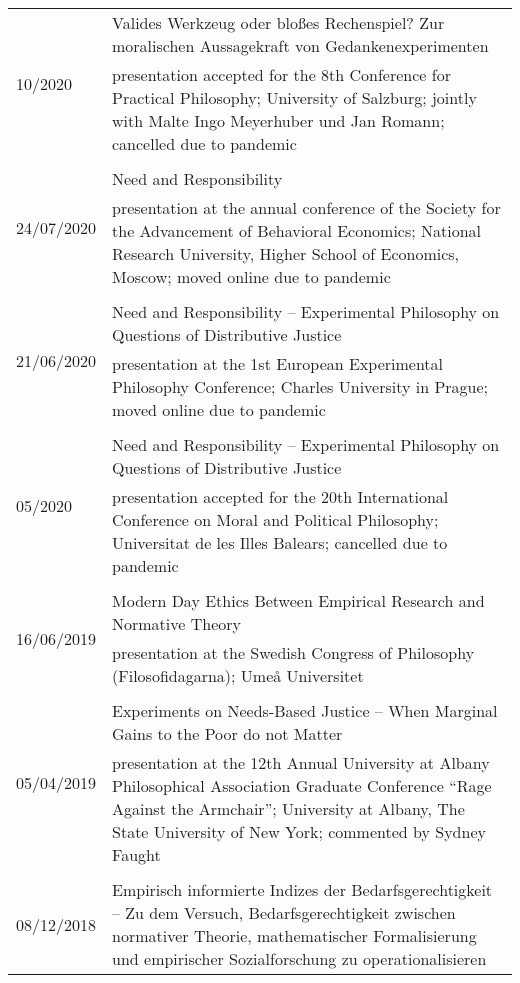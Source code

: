 \documentclass[a4paper,10pt]{article}
\begin{document}
\begin{longtable}{p{}p{11cm}}
\multirow{2}{2,25cm}{\footnotesize{10/2020}} & Valides Werkzeug oder bloßes Rechenspiel? Zur moralischen Aussagekraft von Gedankenexperimenten\\
& \footnotesize{presentation accepted for the 8th Conference for Practical Philosophy; University of Salzburg; jointly with Malte Ingo Meyerhuber und Jan Romann; cancelled due to pandemic}\\
\\
\multirow{2}{2,25cm}{\footnotesize{24/07/2020}} & Need and Responsibility\\
& \footnotesize{presentation at the annual conference of the Society for the Advancement of Behavioral Economics; National Research University, Higher School of Economics, Moscow; moved online due to pandemic}\\
\\
\multirow{2}{2,25cm}{\footnotesize{21/06/2020}} & Need and Responsibility -- Experimental Philosophy on Questions of Distributive Justice\\
& \footnotesize{presentation at the 1st European Experimental Philosophy Conference; Charles University in Prague; moved online due to pandemic}\\
\\
\multirow{2}{2,25cm}{\footnotesize{05/2020}} & Need and Responsibility -- Experimental Philosophy on Questions of Distributive Justice\\
& \footnotesize{presentation accepted for the 20th International Conference on Moral and Political Philosophy; Universitat de les Illes Balears; cancelled due to pandemic}\\
\\
\multirow{2}{2,25cm}{\footnotesize{16/06/2019}} & Modern Day Ethics Between Empirical Research and Normative Theory\\
& \footnotesize{presentation at the Swedish Congress of Philosophy (Filosofidagarna); Umeå Universitet}\\
\\
\multirow{2}{2,25cm}{\footnotesize{05/04/2019}} & Experiments on Needs-Based Justice -- When Marginal Gains to the Poor do not Matter\\
& \footnotesize{presentation at the 12th Annual University at Albany Philosophical Association Graduate Conference \enquote{Rage Against the Armchair}; University at Albany, The State University of New York; commented by Sydney Faught}\\
\\
\multirow{2}{2,25cm}{\footnotesize{08/12/2018}} & Empirisch informierte Indizes der Bedarfsgerechtigkeit -- Zu dem Versuch, Bedarfsgerechtigkeit zwischen normativer Theorie, mathematischer Formalisierung und empirischer Sozialforschung zu operationalisieren\\

\end{longtable}
\end{document}
